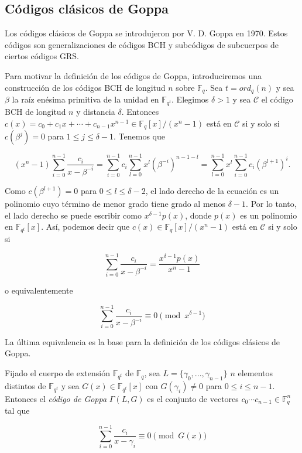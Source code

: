 \subsection{Códigos clásicos de Goppa}

Los códigos clásicos de Goppa se introdujeron por V. D. Goppa en 1970. Estos códigos son generalizaciones de códigos BCH y subcódigos de subcuerpos de ciertos códigos GRS.

Para motivar la definición de los códigos de Goppa, introduciremos una construcción de los códigos BCH de longitud $n$ sobre $\mathbb{F}_q$. Sea $t = ord_q(n)$ y sea $\beta$ la raíz enésima primitiva de la unidad en $\mathbb{F}_{q^t}$. Elegimos $\delta > 1$ y sea $\mathcal{C}$ el código BCH de longitud $n$ y distancia $\delta$. Entonces $c(x) = c_0 + c_1x + \cdots + c_{n-1}x^{n-1} \in \mathbb{F}_q [x] / (x^n - 1)$ está en $\mathcal{C}$ si y solo si $c(\beta^j) = 0$ para $1 \leq j \leq \delta - 1$. Tenemos que 

$$(x^n - 1) \sum_{i=0}^{n-1} \frac{c_i}{x - \beta ^{-i}} = \sum_{i=0}^{n-1} c_i \sum_{l=0}^{n-1} x^l \left( \beta ^{-i} \right) ^{n-1-l} = \sum_{l=0}^{n-1} x^l \sum_{i=0}^{n-1} c_i \left( \beta^{l+1} \right) ^i.$$

Como $c(\beta^{l+1}) = 0$ para $0 \leq l \leq \delta - 2$, el lado derecho de la ecuación es un polinomio cuyo término de menor grado tiene grado al menos $\delta - 1$. Por lo tanto, el lado derecho se puede escribir como $x^{\delta - 1} p(x)$, donde $p(x)$ es un polinomio en $\mathbb{F}_{q^t}[x]$. Así, podemos decir que $c(x) \in \mathbb{F}_q[x] / (x^n - 1)$ está en $\mathcal{C}$ si y solo si 

$$\sum_{i=0}^{n-1} \frac{c_i}{x - \beta ^{-i}} = \frac{x^{\delta - 1} p(x)}{x^n - 1}$$

o equivalentemente

$$\sum_{i=0}^{n-1} \frac{c_i}{x - \beta ^{-i}} \equiv 0 \pmod{x^{\delta - 1}}$$

La última equivalencia es la base para la definición de los códigos clásicos de Goppa.

Fijado el cuerpo de extensión $\mathbb{F}_{q^t}$ de $\mathbb{F}_q$, sea $L = \{ \gamma_0, ..., \gamma_{n-1} \}$ $n$ elementos distintos de $\mathbb{F}_{q^t}$ y sea $G(x) \in \mathbb{F}_{q^t}[x]$ con $G(\gamma_i) \neq 0$ para $0 \leq i \leq n - 1$. Entonces el \emph{código de Goppa} $\Gamma (L,G)$ es el conjunto de vectores $c_0 \cdots c_{n-1} \in \mathbb{F}_q^n$ tal que 

\begin{equation}
    \label{definicion_goppa}
    \sum_{i=0}^{n-1} \frac{c_i}{x - \gamma_i} \equiv 0 \pmod{G(x)}
\end{equation}

